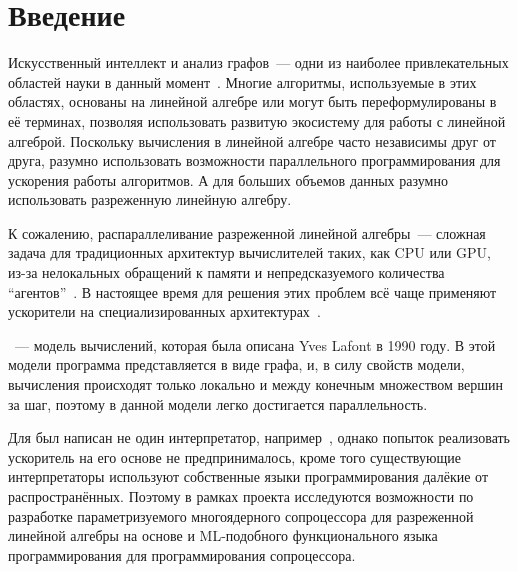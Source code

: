 

\section*{Введение}
\thispagestyle{withCompileDate}

Искусственный интеллект и анализ графов~--- одни из наиболее привлекательных областей науки в данный момент~\cite{chuiEconomicPotentialGenerative, garciaPathQueryingGraph2024a}.
Многие алгоритмы, используемые в этих областях, основаны на линейной алгебре или могут быть переформулированы в её терминах, позволяя использовать развитую экосистему для работы с линейной алгеброй.
Поскольку вычисления в линейной алгебре часто независимы друг от друга, разумно использовать возможности параллельного программирования для ускорения работы алгоритмов.
А для больших объемов данных разумно использовать разреженную линейную алгебру.

К сожалению, распараллеливание разреженной линейной алгебры~--- сложная задача для традиционных архитектур вычислителей таких, как CPU или GPU, из-за нелокальных обращений к памяти и непредсказуемого количества \enquote{агентов}~\cite{duHighPerformanceSparseLinear2022,isaac-chassandeDedicatedHardwareAccelerators2024,mohammedPerformanceEnhancementStrategies2022}.
В настоящее время для решения этих проблем всё чаще применяют ускорители на специализированных архитектурах~\cite{dakkakAcceleratingReductionScan2019, zhuMobileMachineLearning2018, jouppiInDatacenterPerformanceAnalysis2017, akkadEmbeddedDeepLearning2024, silvanoSurveyDeepLearning2024}.

\INs{}~--- модель вычислений, которая была описана Yves Lafont в 1990 году.
В этой модели программа представляется в виде графа, и, в силу свойств модели, вычисления происходят только локально и между конечным множеством вершин за шаг, поэтому в данной модели легко достигается параллельность.

Для \INs{} был написан не один интерпретатор, например~\cite{mackieParallelEvaluationInteraction2016, salikhmetovTokenpassingOptimalReduction2016a}, однако попыток реализовать ускоритель на его основе не предпринималось, кроме того существующие интерпретаторы используют собственные языки программирования далёкие от распространённых.
Поэтому в рамках проекта \Lamagraph{} исследуются возможности по разработке параметризуемого многоядерного сопроцессора для разреженной линейной алгебры на основе \INs{} и ML-подобного функционального языка программирования для программирования сопроцессора.
